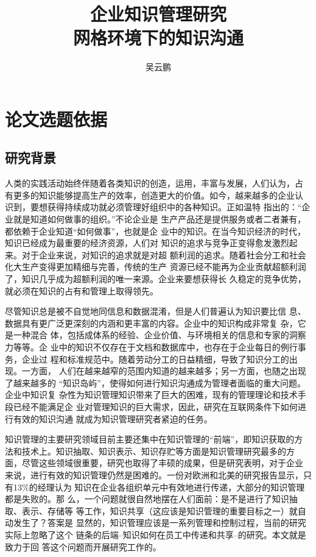 \documentclass[12pt,a4paper]{ctexart}
\begin{document}
  \title{企业知识管理研究\\\large{ 网格环境下的知识沟通}}
  \author {吴云鹏}
   \maketitle
 \newpage
  \tableofcontents



\newpage
  \section{论文选题依据}

  \subsection{研究背景}
人类的实践活动始终伴随着各类知识的创造，运用，丰富与发展，人们认为，占
有更多的知识能够提高生产的效率，创造更大的价值。如今，越来越多的企业认
识到，要想获得持续成功就必须管理好组织中的各种知识。正如温特
\cite{Williamson1994}指出的：“企业就是知道如何做事的组织。”不论企业是
生产产品还是提供服务或者二者兼有，都依赖于企业知道“如何做事”，也就是企
业中的知识。在当今知识经济的时代，知识已经成为最重要的经济资源，人们对
知识的追求与竞争正变得愈发激烈起来。对于企业来说，对知识的追求就是对超
额利润的追求。随着社会分工和社会化大生产变得更加精细与完善，传统的生产
资源已经不能再为企业贡献超额利润了，知识几乎成为超额利润的唯一来源。企业来要想获得长
久稳定的竞争优势，就必须在知识的占有和管理上取得领先。

尽管知识总是被不自觉地同信息和数据混淆，但是人们普遍认为知识要比信
息、数据具有更广泛更深刻的内涵和更丰富的内容。企业中的知识构成非常复
杂，它是一种混合
体，包括成体系的经验、企业价值、与环境相关的信息和专家的洞察力等等。企
业中的知识不仅存在于文档和数据库中，也存在于企业每日的例行事务，企业过
程和标准规范中。随着劳动分工的日益精细，导致了知识分工的出现。一方面，
人们在越来越窄的范围内知道的越来越多；另一方面，也随之出现了越来越多的
“知识岛屿”，使得如何进行知识沟通成为管理者面临的重大问题。企业中知识复
杂性为知识管理知识带来了巨大的困难，现有的管理理论和技术手段已经不能满足企
业对管理知识的巨大需求，因此，研究在互联网条件下如何进行有效的知识沟通
就成为知识管理研究者紧迫的任务。

知识管理的主要研究领域目前主要还集中在知识管理的“前端”，即知识获取的方
法和技术上。知识抽取、知识表示、知识存贮等方面是知识管理研究最多的方
面，尽管这些领域很重要，研究也取得了丰硕的成果，但是研究表明，对于企业
来说，进行有效的知识管理仍然是困难的。一份对欧洲和北美的研究报告显示，只有13\%的经理认为
知识在企业各组织单元中有效地进行传递，大部分的知识管理都是失败的。那
么，一个问题就很自然地摆在人们面前：是不是进行了知识抽取、表示、存储等
等工作，知识共享（这应该是知识管理的重要目标之一）就自动发生了？答案是
显然的，知识管理应该是一系列管理和控制过程，当前的研究实际上忽略了这个
链条的后端--知识如何在员工中传递和共享--的研究。本文就是致力于回
答这个问题而开展研究工作的。
\end{document}
